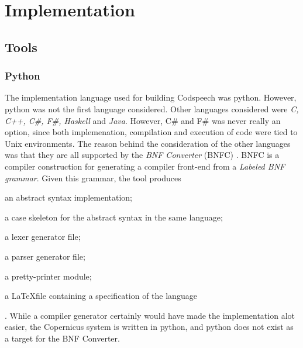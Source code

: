 \chapter{Implementation}\label{chap:implementation}


%
%
%

\section{Tools}

\subsection{Python}
The implementation language used for building Codspeech was
python. However, python was not the first language considered. Other
languages considered were \emph{C, C++, C\#, F\#, Haskell} and
\emph{Java}. However, C\# and F\# was never really an option, since
both implemenation, compilation and execution of code were tied to
Unix environments. The reason behind the consideration of the other
languages was that they are all supported by the \emph{BNF Converter}
(BNFC) \citep{bnfc:online}. BNFC is a compiler construction for
generating a compiler front-end from a \emph{Labeled BNF
  grammar}. Given this grammar, the tool produces
\begin{inparaenum}[(1)]
\item an abstract syntax implementation;
\item a case skeleton for the abstract syntax in the same language;
\item a lexer generator file;
\item a parser generator file;
\item a pretty-printer module;
\item a \LaTeX file containing a specification of the language
\end{inparaenum} \citep{bnfc:online}.
While a compiler generator certainly would have made the
implementation alot easier, the Copernicus system is written in
python, and python does not exist as a target for the BNF Converter.

